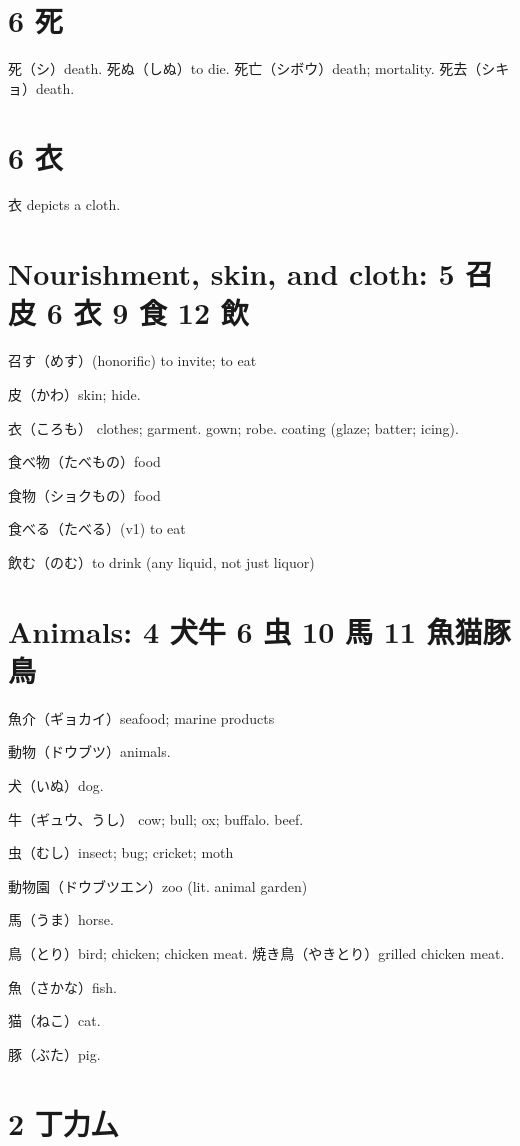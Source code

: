 \section{6 死}

死（シ）death.
死ぬ（しぬ）to die.
死亡（シボウ）death; mortality.
死去（シキョ）death.

\section{6 衣}

衣 depicts a cloth.

\section{Nourishment, skin, and cloth: 5 召皮 6 衣 9 食 12 飲}

召す（めす）(honorific) to invite; to eat

皮（かわ）skin; hide.

衣（ころも）
clothes;
garment. gown;
robe. coating (glaze; batter; icing).

食べ物（たべもの）food

食物（ショクもの）food

食べる（たべる）(v1) to eat

飲む（のむ）to drink (any liquid, not just liquor)

\section{Animals: 4 犬牛 6 虫 10 馬 11 魚猫豚鳥}

魚介（ギョカイ）seafood; marine products

動物（ドウブツ）animals.

犬（いぬ）dog.

牛（ギュウ、うし）
cow; bull; ox; buffalo.
beef.

虫（むし）insect; bug; cricket; moth

動物園（ドウブツエン）zoo (lit. animal garden)

馬（うま）horse.

鳥（とり）bird; chicken; chicken meat.
焼き鳥（やきとり）grilled chicken meat.

魚（さかな）fish.

猫（ねこ）cat.

豚（ぶた）pig.

\section{2 丁力厶}

